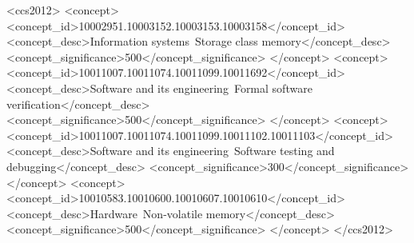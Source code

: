 \documentclass[sigconf,screen]{acmart}
\theoremstyle{invar}
\begin{document}
\title{\papertitle}

\author{Morteza Hoseinzadeh}

\author{Steven Swanson}








\begin{CCSXML}
<ccs2012>
    <concept>
        <concept_id>10002951.10003152.10003153.10003158</concept_id>
        <concept_desc>Information systems~Storage class memory</concept_desc>
        <concept_significance>500</concept_significance>
    </concept>
    <concept>
        <concept_id>10011007.10011074.10011099.10011692</concept_id>
        <concept_desc>Software and its engineering~Formal software verification</concept_desc>
        <concept_significance>500</concept_significance>
        </concept>
    <concept>
        <concept_id>10011007.10011074.10011099.10011102.10011103</concept_id>
        <concept_desc>Software and its engineering~Software testing and debugging</concept_desc>
        <concept_significance>300</concept_significance>
        </concept>
    <concept>
        <concept_id>10010583.10010600.10010607.10010610</concept_id>
        <concept_desc>Hardware~Non-volatile memory</concept_desc>
        <concept_significance>500</concept_significance>
        </concept>
  </ccs2012>
\end{CCSXML}

\end{document}
